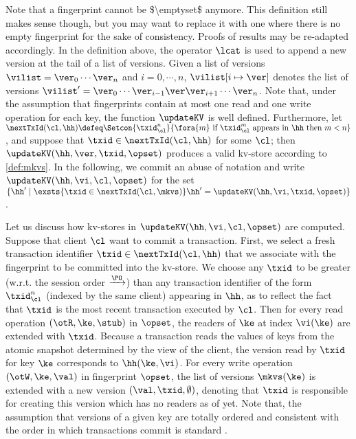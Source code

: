 \ac{Note that a fingerprint cannot be $\emptyset$ anymore. This definition still makes sense though, 
but you may want to replace it with one where there is no empty fingerprint for the sake of consistency. 
Proofs of results may be re-adapted accordingly.}
In the definition above, the operator $\lcat$ is used to append a new version at the tail of 
a list of versions. Given a list of versions $\vilist = \ver_0\cdots \ver_n$ and $i=0,\cdots,n$, 
$\vilist[i \mapsto \ver]$ denotes the list of versions $\vilist' = \ver_0 \cdots \ver_{i-1} \ver \ver_{i+1} \cdots 
\ver_{n}$. 
Note that, under the assumption that fingerprints contain at most one read and one write 
operation for each key, the function $\updateKV$ is well defined. Furthermore, 
let $\nextTxId(\cl, \hh) \defeq
\Setcon{\txid_{\cl}^{n}}{\fora{m} \text{ if } \txid_{\cl}^{m} \text{ appears in } \hh \text{ then } m < n }$, 
and suppose that $\txid \in \nextTxId(\cl, \hh)$ for some $\cl$;
then $\updateKV(\hh, \ver, \txid, \opset)$ produces a valid kv-store according to \cref{def:mkvs}.
In the following, we commit an abuse of notation and write $\updateKV(\hh, \vi, \cl, \opset)$ 
for the set $\{\hh' \mid \exsts { \txid \in \nextTxId(\cl, \mkvs) } \hh' = \updateKV(\hh, \vi, \txid, \opset)\}$.

Let us discuss how kv-stores in $\updateKV(\hh, \vi, \cl, \opset)$ are computed. 
Suppose that client \( \cl \) want to commit a transaction.
First, we select a fresh transaction identifier $\txid \in \nextTxId(\cl, \hh)$ that we associate 
with the fingerprint to be committed into the kv-store. We choose any $\txid$ to be 
greater (w.r.t. the session order $\xrightarrow{\PO}$) than any transaction identifier 
of the form $\txid_{\cl}^{n}$ (indexed by the same client) appearing in $\hh$,
as to reflect the fact that $\txid$ is the most recent transaction executed by $\cl$.
Then for every read operation $(\otR, \ke, \stub)$ in $\opset$,
the readers of $\ke$ at index $\vi(\ke)$ are extended with $\txid$.
Because a transaction reads the values of keys from the atomic 
snapshot determined by the view of the client, the version read by $\txid$ for key $\ke$ 
corresponds to $\hh(\ke, \vi)$.
For every write operation $(\otW, \ke, \val)$ in fingerprint $\opset$, 
the list of versions $\mkvs(\ke)$ is extended with a new version $(\val, \txid, \emptyset)$, 
denoting that $\txid$ is responsible for creating this version which has no readers as of yet. 
Note that, the assumption that versions of 
a given key are totally ordered and consistent with the order in which 
transactions commit is standard \cite{adya,framework-concur,seebelieve}. 

